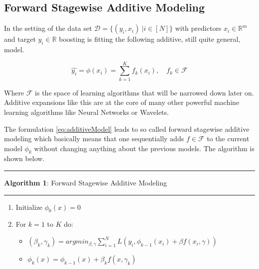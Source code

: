 \documentclass[
]{book}
\providecommand{\tightlist}{%
  \setlength{\itemsep}{0pt}\setlength{\parskip}{0pt}}
\begin{document}
\hypertarget{forward-stagewise-additive-modeling}{%
\subsection{Forward Stagewise Additive Modeling}\label{forward-stagewise-additive-modeling}}

In the setting of the data set \(\mathcal{D} = \{(y_i,x_i)\ | i \in [N]\}\) with predictors \(x_i \in \mathbb{R}^m\) and target \(y_i \in \mathbb{R}\) boosting is fitting the following additive, still quite general, model.

\begin{equation}
  \hat{y_i} = \phi(x_i) = \sum_{k=1}^{K} f_k(x_i), \quad f_k \in \mathcal{F}
  \label{eq:additiveModel}
\end{equation}

Where \(\mathcal{F}\) is the space of learning algorithms that will be narrowed down later on. Additive expansions like this are at the core of many other powerful machine learning algorithms like Neural Networks or Wavelets.\citep{elements}

The formulation \eqref{eq:additiveModel} leads to so called forward stagewise additive modeling which basically means that one sequentially adds \(f \in \mathcal{F}\) to the current model \(\phi_k\) without changing anything about the previous models.\citep{elements} The algorithm is shown below.

\begin{center}\rule{0.5\linewidth}{0.5pt}\end{center}

\textbf{Algorithm 1}: Forward Stagewise Additive Modeling \citep{elements}

\begin{center}\rule{0.5\linewidth}{0.5pt}\end{center}

\begin{enumerate}
\def\labelenumi{\arabic{enumi}.}
\item
  Initialize \(\phi_0(x) = 0\)
\item
  For \(k = 1\) to \(K\) do:

  \begin{itemize}
  \tightlist
  \item
    \((\beta_k,\gamma_k) = argmin_{\beta,\gamma}\sum_{i=1}^N L(y_i,\phi_{k-1}(x_i) + \beta f(x_i,\gamma))\)
  \item
    \(\phi_k(x) = \phi_{k-1}(x) + \beta_k f(x, \gamma_k)\)
  \end{itemize}
\end{enumerate}
\end{document}
